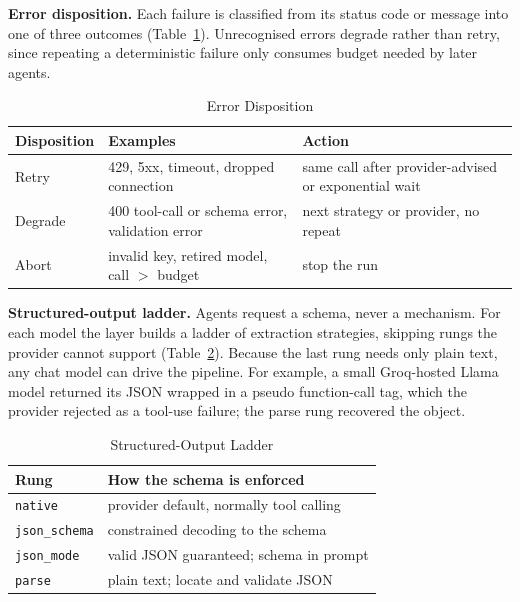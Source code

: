 \documentclass[conference,letterpaper]{IEEEtran}
\begin{document}
\textbf{Error disposition.} Each failure is classified from its status code or
message into one of three outcomes (Table~\ref{tab:errors}). Unrecognised errors
degrade rather than retry, since repeating a deterministic failure only consumes
budget needed by later agents.

\begin{table}[t]
\caption{Error Disposition}
\label{tab:errors}
\centering
\footnotesize
\begin{tabular}{@{}l>{\raggedright}p{3.0cm}>{\raggedright\arraybackslash}p{2.6cm}@{}}
\toprule
Disposition & Examples & Action \\
\midrule
Retry   & 429, 5xx, timeout, dropped connection & same call after provider-advised or exponential wait \\
Degrade & 400 tool-call or schema error, validation error & next strategy or provider, no repeat \\
Abort   & invalid key, retired model, call $>$ budget & stop the run \\
\bottomrule
\end{tabular}
\end{table}

\textbf{Structured-output ladder.} Agents request a schema, never a mechanism.
For each model the layer builds a ladder of extraction strategies, skipping rungs
the provider cannot support (Table~\ref{tab:ladder}). Because the last rung needs
only plain text, any chat model can drive the pipeline. For example, a small
Groq-hosted Llama model returned its JSON wrapped in a pseudo function-call tag,
which the provider rejected as a tool-use failure; the parse rung recovered the
object.

\begin{table}[t]
\caption{Structured-Output Ladder}
\label{tab:ladder}
\centering
\footnotesize
\begin{tabular}{@{}ll@{}}
\toprule
Rung & How the schema is enforced \\
\midrule
\texttt{native}      & provider default, normally tool calling \\
\texttt{json\_schema}& constrained decoding to the schema \\
\texttt{json\_mode}  & valid JSON guaranteed; schema in prompt \\
\texttt{parse}       & plain text; locate and validate JSON \\
\bottomrule
\end{tabular}
\end{table}
\end{document}
